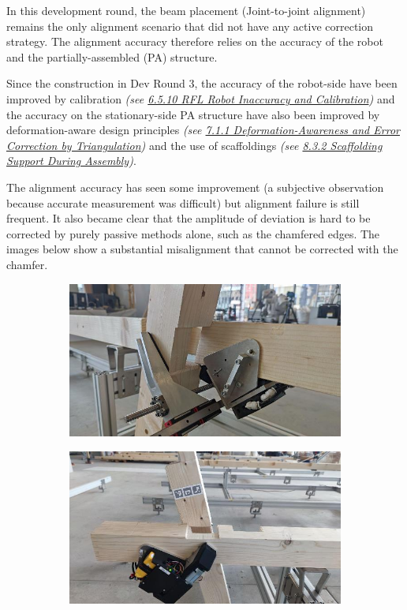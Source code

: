 \documentclass[11pt]{book}
\begin{document}
In this development round, the beam placement (Joint-to-joint alignment) remains the only alignment scenario that did not have any active correction strategy. The alignment accuracy therefore relies on the accuracy of the robot and the partially-assembled (PA) structure. 

Since the construction in Dev Round 3, the accuracy of the robot-side have been improved by calibration \textit{(see \uline{6.5.10 RFL Robot Inaccuracy and Calibration})} and the accuracy on the stationary-side PA structure have also been improved by deformation-aware design principles \textit{(see \uline{7.1.1 Deformation-Awareness and Error Correction by Triangulation})} and the use of scaffoldings \textit{(see \uline{8.3.2 Scaffolding Support During Assembly})}.

The alignment accuracy has seen some improvement (a subjective observation because accurate measurement was difficult) but alignment failure is still frequent. It also became clear that the amplitude of deviation is hard to be corrected by purely passive methods alone, such as the chamfered edges. The images below show a substantial misalignment that cannot be corrected with the chamfer. 

\begin{figure}[H]
\centering
\begin{subfigure}[b]{0.45\textwidth}
\centering
\includegraphics[width=\textwidth]{./images/image37.jpeg}
\end{subfigure}
\hfill
\begin{subfigure}[b]{0.45\textwidth}
\centering
\includegraphics[width=\textwidth]{./images/image38.jpeg}
\end{subfigure}
\end{figure}
\end{document}
